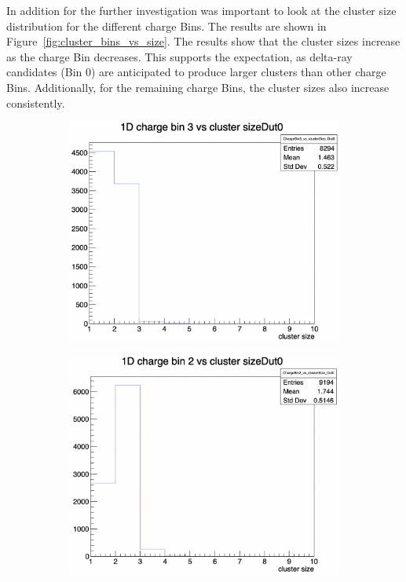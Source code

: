 In addition for the further investigation was important to look at the cluster size distribution for the different charge Bins. The results are shown in Figure~\ref{fig:cluster_bins_vs_size}. The results show that the cluster sizes increase as the charge Bin decreases. This supports the expectation, as delta-ray candidates (Bin 0) are anticipated to produce larger clusters than other charge Bins. Additionally, for the remaining charge Bins, the cluster sizes also increase consistently.

\begin{figure}[H]
    \centering
    \begin{subfigure}[t]{0.45\textwidth}
        \centering
        \includegraphics[width=\textwidth]{images/chargeBin3_us_clsize.png}
        \caption{}
        \label{fig:dist_a}
    \end{subfigure}
    \hfill
    \begin{subfigure}[t]{0.45\textwidth}
        \centering
        \includegraphics[width=\textwidth]{images/ClusBin2_us_clus_size.png}
        \caption{}
        \label{fig:dist_b}
    \end{subfigure}


\end{figure}
